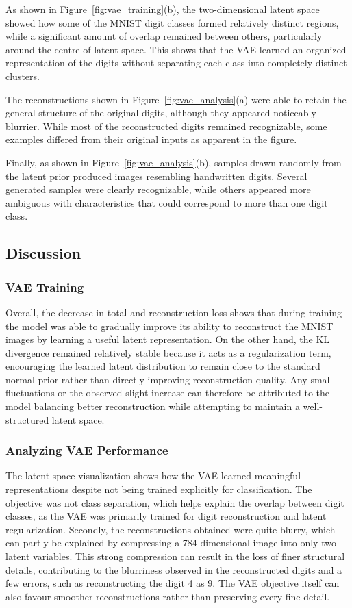 \documentclass{article}
\begin{document}
As shown in Figure~\ref{fig:vae_training}(b), the two-dimensional latent space showed how some of the MNIST digit classes formed relatively distinct regions, while a significant amount of overlap remained between others, particularly around the centre of latent space. This shows that the VAE learned an organized representation of the digits without separating each class into completely distinct clusters.

The reconstructions shown in Figure~\ref{fig:vae_analysis}(a) were able to retain the general structure of the original digits, although they appeared noticeably blurrier. While most of the reconstructed digits remained recognizable, some examples differed from their original inputs as apparent in the figure.

Finally, as shown in Figure~\ref{fig:vae_analysis}(b), samples drawn randomly from the latent prior produced images resembling handwritten digits. Several generated samples were clearly recognizable, while others appeared more ambiguous with characteristics that could correspond to more than one digit class.



\subsection{Discussion}
\subsubsection{VAE Training}
Overall, the decrease in total and reconstruction loss shows that during training the model was able to gradually improve its ability to reconstruct the MNIST images by learning a useful latent representation. On the other hand, the KL divergence remained relatively stable because it acts as a regularization term, encouraging the learned latent distribution to remain close to the standard normal prior rather than directly improving reconstruction quality. Any small fluctuations or the observed slight increase can therefore be attributed to the model balancing better reconstruction while attempting to maintain a well-structured latent space.

\subsubsection{Analyzing VAE Performance}
The latent-space visualization shows how the VAE learned meaningful representations despite not being trained explicitly for classification. The objective was not class separation, which helps explain the overlap between digit classes, as the VAE was primarily trained for digit reconstruction and latent regularization. Secondly, the reconstructions obtained were quite blurry, which can partly be explained by compressing a 784-dimensional image into only two latent variables. This strong compression can result in the loss of finer structural details, contributing to the blurriness observed in the reconstructed digits and a few errors, such as reconstructing the digit 4 as 9. The VAE objective itself can also favour smoother reconstructions rather than preserving every fine detail.
\end{document}
